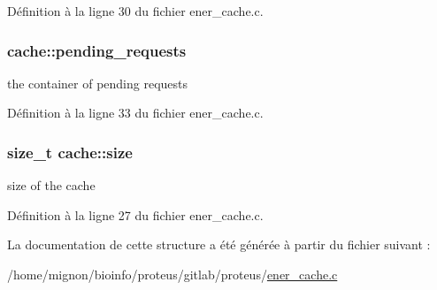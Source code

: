 Définition à la ligne 30 du fichier ener\+\_\+cache.\+c.

\hypertarget{structcache_a265e519d03a385270d2757369e1993b8}{
\subsubsection[{pending\+\_\+requests}]{ cache\+::pending\+\_\+requests}}\label{structcache_a265e519d03a385270d2757369e1993b8}


the container of pending requests 



Définition à la ligne 33 du fichier ener\+\_\+cache.\+c.

\hypertarget{structcache_a1887f2c37603f0e5229e6e4eab39405c}{
\subsubsection[{size}]{\setlength{\rightskip}{0pt plus 5cm}size\+\_\+t cache\+::size}}\label{structcache_a1887f2c37603f0e5229e6e4eab39405c}


size of the cache 



Définition à la ligne 27 du fichier ener\+\_\+cache.\+c.



La documentation de cette structure a été générée à partir du fichier suivant \+:\begin{DoxyCompactItemize}
\item 
/home/mignon/bioinfo/proteus/gitlab/proteus/\hyperlink{ener__cache_8c}{ener\+\_\+cache.\+c}\end{DoxyCompactItemize}

